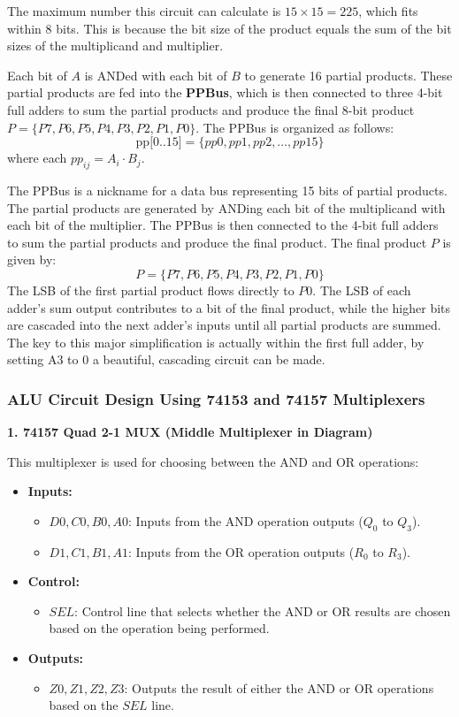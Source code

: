 \documentclass[12pt]{article}
\begin{document}
The maximum number this circuit can calculate is \( 15 \times 15 = 225 \), which fits within 8 bits. This is because the bit size of the product equals the sum of the bit sizes of the multiplicand and multiplier.

Each bit of \( A \) is ANDed with each bit of \( B \) to generate 16 partial products. These partial products are fed into the \textbf{PPBus}, which is then connected to three 4-bit full adders to sum the partial products and produce the final 8-bit product \( P = \{P7, P6, P5, P4, P3, P2, P1, P0\} \).
The PPBus is organized as follows:
\[
	\text{pp[0..15]} = \{ pp0, pp1, pp2, \dots, pp15 \}
\]
where each \( pp_{ij} = A_i \cdot B_j \).

The PPBus is a nickname for a data bus representing 15 bits of partial products. The partial products are generated by ANDing each bit of the multiplicand with each bit of the multiplier. The PPBus is then connected to the 4-bit full adders to sum the partial products and produce the final product.
The final product \( P \) is given by:
\[
	P = \{ P7, P6, P5, P4, P3, P2, P1, P0 \}
\]
The LSB of the first partial product flows directly to \( P0 \). The LSB of each adder's sum output contributes to a bit of the final product, while the higher bits are cascaded into the next adder’s inputs until all partial products are summed. The key to this major simplification is actually within the first full adder, by setting A3 to \(0\) a beautiful, cascading circuit can be made.
\subsubsection*{ALU Circuit Design Using 74153 and 74157 Multiplexers}
\textbf{1. 74157 Quad 2-1 MUX (Middle Multiplexer in Diagram)}

This multiplexer is used for choosing between the AND and OR operations:
\begin{itemize}
	\item \textbf{Inputs:}
	      \begin{itemize}
		      \item \( D0, C0, B0, A0 \): Inputs from the AND operation outputs (\( Q_0 \) to \( Q_3 \)).
		      \item \( D1, C1, B1, A1 \): Inputs from the OR operation outputs (\( R_0 \) to \( R_3 \)).
	      \end{itemize}
	\item \textbf{Control:}
	      \begin{itemize}
		      \item \( SEL \): Control line that selects whether the AND or OR results are chosen based on the operation being performed.
	      \end{itemize}
	\item \textbf{Outputs:}
	      \begin{itemize}
		      \item \( Z0, Z1, Z2, Z3 \): Outputs the result of either the AND or OR operations based on the \( SEL \) line.
	      \end{itemize}
\end{itemize}
\end{document}
